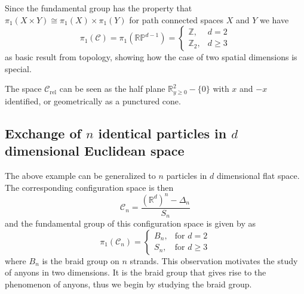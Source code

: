 \documentclass[a4paper,10pt,oneside]{book}
\theoremstyle{plain}
\theoremstyle{definition}
\theoremstyle{remark}
\newcommand{\Z}{\mathbb{Z}}
\newcommand{\R}{\mathbb{R}}
\begin{document}
Since the fundamental group has the property that $π_1(X\times Y) \cong π_1(X) \times π_1(Y)$ for path connected spaces $X$ and $Y$ we have
\begin{equation}
  π_1(\mathcal{C}) = π_1(\R\mathbb{P}^{d-1}) =
  \begin{cases}
    \Z, & d = 2 \\
    \Z_2, & d \ge 3
  \end{cases}
\end{equation}
as basic result from topology, showing how the case of two spatial dimensions is special.

The space $\mathcal{C}_\text{rel}$ can be seen as the half plane $\R^2_{y \ge 0} - \{ 0 \}$ with $x$ and $-x$ identified, or geometrically as a punctured cone.






\subsection{Exchange of $n$ identical particles in $d$ dimensional Euclidean space}

The above example can be generalized to $n$ particles in $d$ dimensional flat space. The corresponding configuration space is then
\begin{equation}
  \mathcal{C}_n = \frac{\left(\mathbb{R}^d\right)^n - \Delta_n}{S_n}
\end{equation}
and the fundamental group of this configuration space is given by \cite{fröhlich} as
\begin{equation}
  π_1(\mathcal{C}_n) =
  \begin{cases}
    B_n, & \text{for $d = 2$} \\
    S_n, & \text{for $d \ge 3$}
  \end{cases}
\end{equation}
where $B_n$ is the braid group on $n$ strands. This observation motivates the study of anyons in two dimensions. It is the braid group that gives rise to the phenomenon of anyons, thus we begin by studying the braid group.
\end{document}

